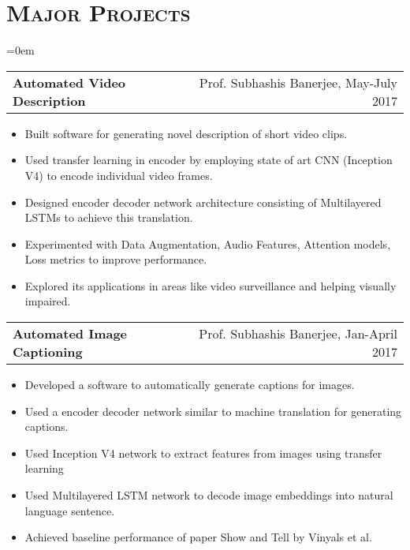 \documentclass{article}
\makeatletter
\newcommand{\headerrow}[2]
{\begin{tabular*}{\linewidth}{l@{\extracolsep{\fill}}r}
	#1 &
	#2 \\
\end{tabular*}}
\newcommand{\tmpsection}[1]{}
\let\tmpsection=\section
\renewcommand{\section}[1]{\tmpsection*{\textsc{#1}}}
\makeatother
\begin{document}
\section{Major Projects}
\begin{list} {}{\leftmargin=0em}
\setlength{\leftmargin}{0pt}

    \item[]
    \headerrow {\textbf{Automated Video Description}}{Prof. Subhashis Banerjee, May-July 2017}
    \begin{itemize}
    \setlength\itemsep{0.0em}
        \item Built software for generating novel description of short video clips.
        \item Used transfer learning in encoder by employing state of art CNN (Inception V4) to encode individual video frames.
        \item Designed encoder decoder network architecture consisting of Multilayered LSTMs to achieve this translation.
        \item Experimented with Data Augmentation, Audio Features, Attention models, Loss metrics to improve performance.
        \item Explored its applications in areas like video surveillance and helping visually impaired.
    \end{itemize}

    \item[]
    \headerrow {\textbf{Automated Image Captioning}}{Prof. Subhashis Banerjee, Jan-April 2017}
    \begin{itemize}
    \setlength\itemsep{0.0em}
        \item Developed a software to automatically generate captions for images.
        \item Used a encoder decoder network similar to machine translation for generating captions.
        \item Used Inception V4 network to extract features from images using transfer learning
        \item Used Multilayered LSTM network to decode image embeddings into natural language sentence.
        \item Achieved baseline performance of paper Show and Tell by Vinyals et al.
    \end{itemize}


\end{list}
\end{document}

